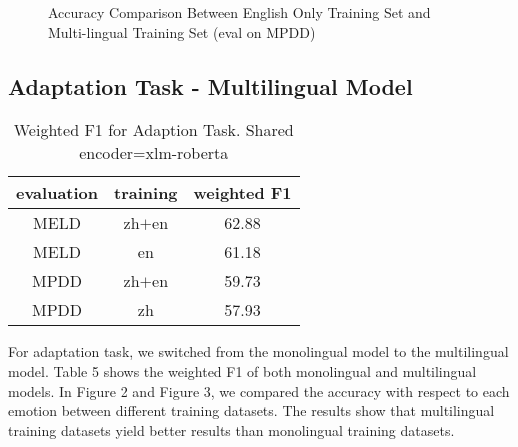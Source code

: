 \documentclass[11pt]{article}
\begin{document}
\begin{figure*}
\caption{Accuracy Comparison Between English Only Training Set and Multi-lingual Training Set (eval on MPDD)}
\end{figure*}

\subsection{Adaptation Task - Multilingual Model}

\begin{table}[hbt]
  \centering
  \begin{tabular}{c|c|c}
    evaluation & training & weighted F1 \\
    \hline
    MELD & zh$+$en & 62.88 \\
    \hline
    MELD & en & 61.18 \\
    \hline
    MPDD & zh$+$en & 59.73 \\
    \hline
    MPDD & zh & 57.93
  \end{tabular}
  \caption{Weighted F1 for Adaption Task. Shared encoder=xlm-roberta}
\end{table}

For adaptation task, we switched from the monolingual model to the multilingual model. Table 5 shows the weighted F1 of both monolingual and multilingual models. In Figure 2 and Figure 3, we compared the accuracy with respect to each emotion between different training datasets. The results show that multilingual training datasets yield better results than monolingual training datasets. 
\end{document}
